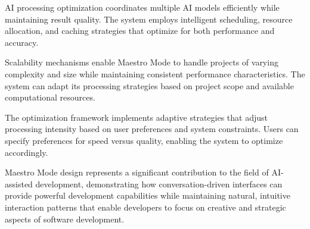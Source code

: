 AI processing optimization coordinates multiple AI models efficiently while maintaining result quality. The system employs intelligent scheduling, resource allocation, and caching strategies that optimize for both performance and accuracy.

Scalability mechanisms enable Maestro Mode to handle projects of varying complexity and size while maintaining consistent performance characteristics. The system can adapt its processing strategies based on project scope and available computational resources.

The optimization framework implements adaptive strategies that adjust processing intensity based on user preferences and system constraints. Users can specify preferences for speed versus quality, enabling the system to optimize accordingly.

Maestro Mode design represents a significant contribution to the field of AI-assisted development, demonstrating how conversation-driven interfaces can provide powerful development capabilities while maintaining natural, intuitive interaction patterns that enable developers to focus on creative and strategic aspects of software development.
